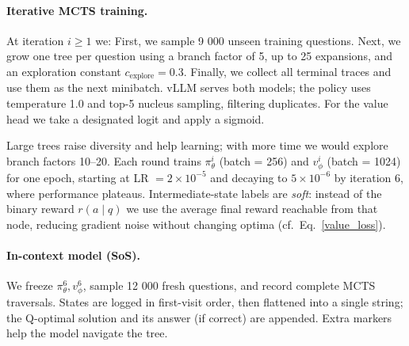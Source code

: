 \documentclass{article}
\begin{document}
\paragraph{Iterative MCTS training.}
At iteration $i\!\ge\!1$ we:
First, we sample 9 000 unseen training questions. Next, we grow one tree per question using a branch factor of 5, up to 25 expansions, and an exploration constant $c_{\text{explore}}=0.3$. Finally, we collect all terminal traces and use them as the next minibatch. vLLM serves both models; the policy uses temperature 1.0
and top-5 nucleus sampling, filtering duplicates.
For the value head we take a designated logit and apply a sigmoid.

Large trees raise diversity and help learning; with more time we would
explore branch factors 10–20.
Each round trains
$\pi_\theta^i$ (batch = 256) and $v_\phi^i$ (batch = 1024) for one epoch,
starting at LR $=2\!\times\!10^{-5}$ and decaying to
$5\!\times\!10^{-6}$ by iteration 6, where performance plateaus.
Intermediate-state labels are \emph{soft}: instead of the binary reward
$r(a\mid q)$ we use the average final reward reachable from that node,
reducing gradient noise without changing optima
(cf.\ Eq.~\ref{value_loss}).

\paragraph{In-context model (SoS).}
We freeze $\pi_\theta^6,v_\phi^6$, sample 12 000 fresh questions,
and record complete MCTS traversals.
States are logged in first-visit order, then flattened into a single
string; the Q-optimal solution and its answer (if correct) are appended.
Extra markers help the model navigate the tree.
\end{document}

